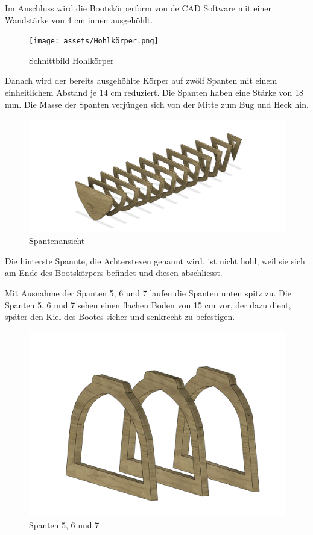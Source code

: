 Im Anschluss wird die Bootskörperform von de CAD Software mit einer Wandstärke von 4 cm innen ausgehöhlt.
\begin{figure}[H]
    \centering
    \texttt{[image: assets/Hohlkörper.png]}
    \caption{Schnittbild Hohlkörper}

\end{figure}
Danach wird der bereits ausgehöhlte Körper auf zwölf Spanten mit einem einheitlichem Abstand je 14 cm reduziert. Die Spanten haben eine Stärke von 18 mm. Die Masse der Spanten verjüngen sich von der Mitte zum Bug und Heck hin.

\begin{figure}[H]
    \centering
    \includegraphics[width=1\linewidth]{assets/rippen_cad.png}
    \caption{Spantenansicht}
    
\end{figure}
Die hinterste Spannte, die Achtersteven genannt wird, ist nicht hohl, weil sie sich am Ende des Bootskörpers befindet und diesen abschliesst.

Mit Ausnahme der Spanten 5, 6 und 7 laufen die Spanten unten spitz zu. Die Spanten 5, 6 und 7 sehen einen flachen Boden von 15 cm vor, der dazu dient, später den Kiel des Bootes sicher und senkrecht zu befestigen.

\begin{figure}[H]
    \centering
    \includegraphics[width=0.5\linewidth]{assets/spanent_upside_down.png}
    \caption{Spanten 5, 6 und 7}
    
\end{figure}

